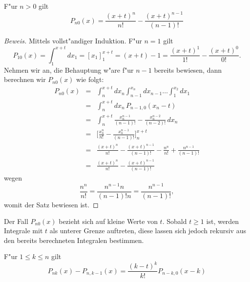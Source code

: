\begin{satz}F"ur $n>0$ gilt
\begin{equation}
P_{n0}(x)=\frac{(x+t)^n}{n!}-\frac{(x+t)^{n-1}}{(n-1)!}
\end{equation}
\end{satz}
\begin{proof}[Beweis]
Mittels vollst"andiger Induktion. F"ur $n=1$ gilt
$$P_{10}(x)=\int_1^{x+t}dx_1=[x_1]_1^{x+t}=(x+t)-1=\frac{(x+t)^1}{1!}-\frac{(x+t)^0}{0!}.$$
Nehmen wir an, die Behauptung w"are f"ur $n-1$ bereits bewiesen, dann
berechnen wir $P_{n0}(x)$ wie folgt:
\begin{eqnarray*}
P_{n0}(x)
&=&\int_n^{x+t}dx_n\int_{n-1}^{x_n}dx_{n-1}\dots\int_1^{x_2}dx_1\\
&=&\int_n^{x+t}dx_n\,P_{n-1,0}(x_n-t)\\
&=&\int_n^{x+t}\frac{x_n^{n-1}}{(n-1)!}-\frac{x_n^{n-2}}{(n-2)!}\,dx_n\\
&=&\biggl[\frac{x_n^n}{n!}-\frac{x_n^{n-1}}{(n-1)!}\biggr]_n^{x+t}\\
&=&
\frac{(x+t)^n}{n!}-\frac{(x+t)^{n-1}}{(n-1)!}
-\frac{n^n}{n!}+\frac{n^{n-1}}{(n-1)!}\\
&=&
\frac{(x+t)^n}{n!}-\frac{(x+t)^{n-1}}{(n-1)!}
\end{eqnarray*}
wegen
$$\frac{n^n}{n!}=\frac{n^{n-1}n}{(n-1)! n}=\frac{n^{n-1}}{(n-1)!},$$
womit der Satz bewiesen ist.
\end{proof}

Der Fall $P_{n0}(x)$ bezieht sich auf kleine Werte von $t$. Sobald 
$t\ge 1$ ist, werden Integrale mit $t$ als unterer Grenze auftreten,
diese lassen sich jedoch rekursiv aus den bereits berechneten
Integralen bestimmen.

\begin{satz}\label{kn-rekursion}
F"ur $1\le k\le n$ gilt
\begin{equation}
P_{nk}(x)-P_{n,k-1}(x)
=
\frac{(k-t)^k}{k!}P_{n-k,0}(x-k)
\end{equation}
\end{satz}


